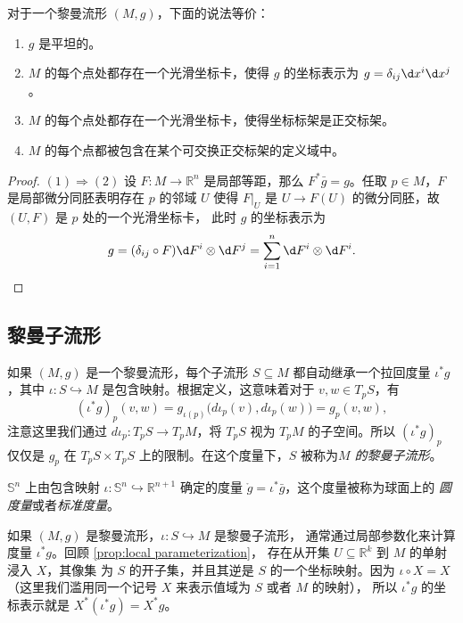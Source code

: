 \begin{theorem}
  对于一个黎曼流形 $(M,g)$，下面的说法等价：
  \begin{enumerate}
    \item $g$ 是平坦的。
    \item $M$ 的每个点处都存在一个光滑坐标卡，使得 $g$ 的坐标表示为
    $g=\delta_{ij}\d x^i\d x^j$。
    \item $M$ 的每个点处都存在一个光滑坐标卡，使得坐标标架是正交标架。
    \item $M$ 的每个点都被包含在某个可交换正交标架的定义域中。
  \end{enumerate}
\end{theorem}
\begin{proof}
  $(1)\Rightarrow (2)$ 设 $F:M\to \mathbb{R}^n$ 是局部等距，那么
  $F^*\bar g=g$。任取 $p\in M$，$F$ 是局部微分同胚表明存在 $p$ 的邻域 $U$ 使得 $F|_U$
  是 $U\to F(U)$ 的微分同胚，故 $(U,F)$ 是 $p$ 处的一个光滑坐标卡，
  此时 $g$ 的坐标表示为
  \[
    g=(\delta_{ij}\circ F) \d F^i\otimes \d F^j=\sum_{i=1}^n
    \d F^i\otimes \d F^i.\qedhere
  \]
\end{proof}


\subsection{黎曼子流形}

如果 $(M,g)$ 是一个黎曼流形，每个子流形 $S\subseteq M$
都自动继承一个拉回度量 $\iota^*g$，其中 $\iota:S\hookrightarrow M$
是包含映射。根据定义，这意味着对于 $v,w\in T_pS$，有
\[
  (\iota^*g)_p(v,w)=g_{\iota(p)}\bigl(d\iota_p(v),d\iota_p(w)\bigr)
  =g_p(v,w),
\]
注意这里我们通过 $d\iota_p:T_pS\to T_pM$，将 $T_pS$ 视为 $T_pM$
的子空间。所以 $(\iota^*g)_p$ 仅仅是 $g_p$ 在 $T_pS\times T_pS$
上的限制。在这个度量下，$S$ 被称为\emph{$M$ 的黎曼子流形}。

\begin{example}
  $\mathbb{S}^n$ 上由包含映射 $\iota:\mathbb{S}^n\hookrightarrow \mathbb{R}^{n+1}$
  确定的度量 $\mathring{g}=\iota^*\bar g$，这个度量被称为球面上的
  \emph{圆度量}或者\emph{标准度量}。
\end{example}

如果 $(M,g)$ 是黎曼流形，$\iota:S\hookrightarrow M$ 是黎曼子流形，
通常通过局部参数化来计算度量 $\iota^*g$。回顾 \autoref{prop:local parameterization}，
存在从开集 $U\subseteq \mathbb{R}^k$ 到 $M$ 的单射浸入 $X$，其像集
为 $S$ 的开子集，并且其逆是 $S$ 的一个坐标映射。因为 $\iota\circ X=X$
（这里我们滥用同一个记号 $X$ 来表示值域为 $S$ 或者 $M$ 的映射），
所以 $\iota^*g$ 的坐标表示就是 $X^*(\iota^*g)=X^*g$。

